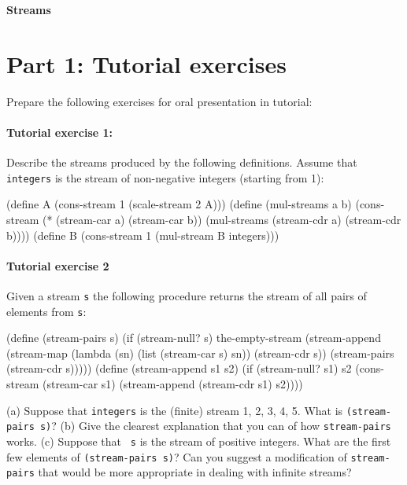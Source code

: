 



\begin{center}
{\bf Streams}
\end{center}

\section{Part 1: Tutorial exercises}

Prepare the following exercises for oral presentation in tutorial:

\paragraph{Tutorial exercise 1:}
Describe the streams produced by the following definitions.  Assume
that {\tt integers} is the stream of non-negative integers (starting
from 1):

\beginlisp
(define A (cons-stream 1 (scale-stream 2 A)))
\null
(define (mul-streams a b)
  (cons-stream
   (* (stream-car a) (stream-car b))
   (mul-streams (stream-cdr a)
                (stream-cdr b))))
\null
(define B (cons-stream 1 (mul-stream B integers)))
\endlisp

\paragraph{Tutorial exercise 2}

Given a stream {\tt s} the following procedure returns the stream of
all pairs of elements from {\tt s}:

\beginlisp
(define (stream-pairs s)
  (if (stream-null? s)
      the-empty-stream
      (stream-append
       (stream-map
        (lambda (sn) (list (stream-car s) sn))
        (stream-cdr s))
       (stream-pairs (stream-cdr s)))))
\null
(define (stream-append s1 s2)
  (if (stream-null? s1)
      s2
      (cons-stream (stream-car s1)
                   (stream-append (stream-cdr s1) s2))))
\endlisp

\noindent
(a) Suppose that {\tt integers} is the (finite) stream 1, 2, 3, 4, 5.
What is {\tt (stream-pairs s)}?  (b) Give the clearest explanation
that you can of how {\tt stream-pairs} works.  (c) Suppose that {\tt
s} is the stream of positive integers.  What are the first few
elements of {\tt (stream-pairs s)}?  Can you suggest a modification of
{\tt stream-pairs} that would be more appropriate in dealing with
infinite streams?



